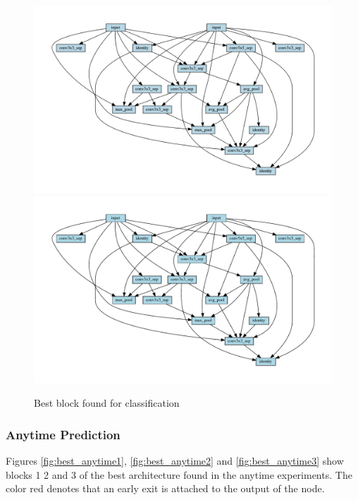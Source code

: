 \begin{figure}[h]
\iflatexml
\includegraphics[width=6\linewidth]{figures/graph_-2132791772218152156.png}
\else
\includegraphics[width=\linewidth]{figures/graph_-2132791772218152156.pdf}
\fi
\caption{Best block found for classification}
\label{fig:best_block}
\end{figure}

\subsubsection{Anytime Prediction}
Figures \ref{fig:best_anytime1}, \ref{fig:best_anytime2} and \ref{fig:best_anytime3} show blocks 1 2 and 3 of the best architecture found in the anytime experiments. The color red denotes that an early exit is attached to the output of the node.

